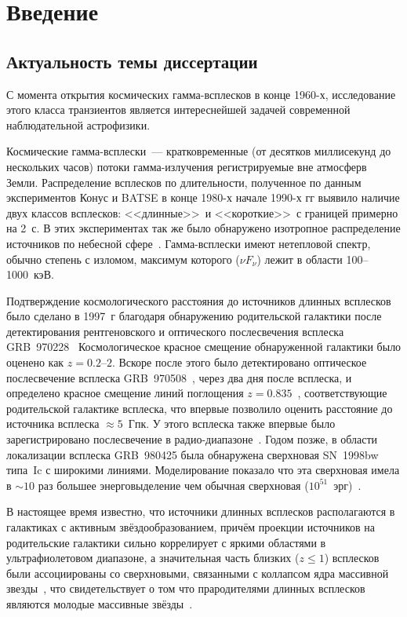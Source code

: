 \chapter{Введение}					
	
\section{Актуальность темы диссертации}
С момента открытия космических гамма-всплесков в конце 1960-х, исследование этого класса транзиентов
является интереснейшей задачей современной наблюдательной астрофизики.

Космические гамма-всплески~--- кратковременные (от десятков миллисекунд до нескольких часов) 
потоки гамма-излучения регистрируемые вне атмосферв Земли. Распределение всплесков по длительности, 
полученное по данным экспериментов Конус и BATSE в конце 1980-х начале 1990-х гг выявило наличие 
двух классов всплесков: <<длинные>>\ и <<короткие>>\ с границей примерно на 2~с. 
В этих экспериментах так же было обнаружено изотропное распределение источников 
по небесной сфере~\citep{Mazets_1981_part_1,Briggs_1993ApJ}. Гамма-всплески имеют нетепловой спектр, 
обычно степень с изломом, максимум которого ($\nu F_{\nu}$) лежит в области 100--1000~кэВ.

Подтверждение космологического расстояния до источников длинных всплесков 
было сделано в 1997~г благодаря обнаружению родительской галактики после детектирования 
рентгеновского и оптического послесвечения всплеска GRB~970228~\citep{Costa1997Natur, van_Paradijs_1997Natur} 
Космологическое красное смещение обнаруженной галактики было оценено как $z=0.2\textrm{--}2$.
Вскоре после этого было детектировано оптическое послесвечение всплеска 
GRB~970508~\citep{Djorgovski1997Natur}, через два дня после всплеска, и определено красное смещение линий 
поглощения $z=0.835$~\citep{Metzger_1997Natur, Reichart_1998ApJ}, соответствующие родительской галактике 
всплеска, что впервые позволило оценить расстояние до источника всплеска $\approx 5$~Гпк. 
У этого всплеска также впервые было зарегистрировано послесвечение в радио-диапазоне~\citep{Frail_1997Natur}.
Годом позже, в области локализации всплеска GRB~980425 была обнаружена сверхновая 
SN~1998bw типа~Ic с широкими линиями. Моделирование показало что эта сверхновая 
имела в $\sim 10$ раз большее энерговыделение чем обычная 
сверхновая ($10^{51}$~эрг)~\citep{Hjorth_and_Bloom_2012in_book}.

В настоящее время известно, что источники длинных всплесков располагаются в галактиках 
с активным звёздообразованием, причём проекции источников на родительские галактики сильно
коррелирует с яркими областями в ультрафиолетовом диапазоне, а значительная часть 
близких ($z \le 1$) всплесков были ассоциированы со сверхновыми, связанными с 
коллапсом ядра массивной звезды~\citep{Hjorth_and_Bloom_2012in_book},
что свидетельствует о том что прародителями длинных всплесков являются молодые 
массивные звёзды~\citep[см. обзор][]{Berger_2014ARAA}.

